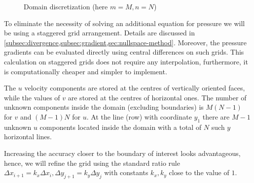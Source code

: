 \documentclass{article}
\numberwithin{equation}{section}
\begin{document}
\begin{figure}[H] %
  \caption{Domain discretization (here $m=M, n=N$)}\label{bl-domain-discretization}
\end{figure}

To eliminate the necessity of solving an additional equation for pressure we will be using a staggered grid arrangement. 
	Details are discussed in \cref{subsec:divergence,subsec:gradient,sec:nullspace-method}. 
	Moreover, the pressure gradients can be evaluated directly using central differences on such grids. 
	This calculation on staggered grids does not require any interpolation, furthermore, it is computationally cheaper and simpler to implement. 

The $u$ velocity components are stored at the centres of vertically oriented faces, while the values of $v$ are stored at the centres of horizontal ones. 
	The number of unknown components inside the domain (excluding boundaries) is $M(N-1)$ for $v$ and $(M-1)N$ for $u$. 
	At the line (row) with coordinate $y_1$ there are $M-1$ unknown $u$ components located inside the domain with a total of $N$ such $y$ horizontal lines. 

Increasing the accuracy closer to the boundary of interest looks advantageous, hence, we will refine the grid using the standard ratio rule $\Delta x_{i+1}=k_x\Delta x_i,\Delta y_{j+1}=k_y\Delta y_j$ with constants $k_x,k_y$ close to the value of $1$. 
\end{document}
